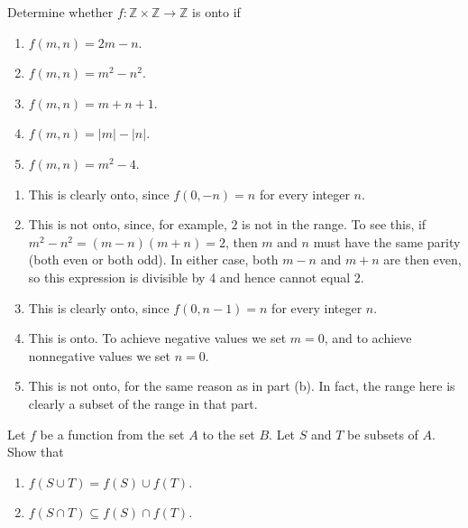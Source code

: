 \begin{exercise}
	Determine whether \( f: \mathbb{Z} \times \mathbb{Z} \rightarrow \mathbb{Z} \) is onto if
	\begin{enumerate}[label=(\alph*)]
		\item \( f(m, n) = 2m - n. \)
		\item \( f(m, n) = m^2 - n^2. \)
		\item \( f(m, n) = m + n + 1. \)
		\item \( f(m, n) = |m| - |n|. \)
		\item \( f(m, n) = m^2 - 4. \)
	\end{enumerate}
	\end{exercise}
	
	\begin{solution} 
	\begin{enumerate}[label=(\alph*)]
		\item This is clearly onto, since \( f(0, -n) = n \) for every integer \( n \).
		\item This is not onto, since, for example, \( 2 \) is not in the range. To see this, if \( m^2 - n^2 = (m - n)(m + n) = 2 \), then \( m \) and \( n \) must have the same parity (both even or both odd). In either case, both \( m - n \) and \( m + n \) are then even, so this expression is divisible by 4 and hence cannot equal 2.
		\item This is clearly onto, since \( f(0, n - 1) = n \) for every integer \( n \).
		\item This is onto. To achieve negative values we set \( m = 0 \), and to achieve nonnegative values we set \( n = 0 \).
		\item This is not onto, for the same reason as in part (b). In fact, the range here is clearly a subset of the range in that part.
	\end{enumerate}
	\end{solution}

	\begin{exercise}
		Let \( f \) be a function from the set \( A \) to the set \( B \). Let \( S \) and \( T \) be subsets of \( A \). Show that
		\begin{enumerate}[label=(\alph*)]
			\item \( f(S \cup T) = f(S) \cup f(T) \).
			\item \( f(S \cap T) \subseteq f(S) \cap f(T) \).
		\end{enumerate}
		\end{exercise}
		
